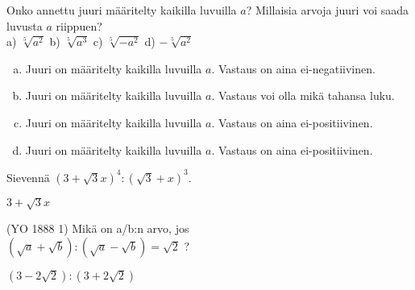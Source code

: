 \begin{tehtava}
Onko annettu juuri määritelty kaikilla luvuilla $a$? Millaisia arvoja juuri voi saada luvusta $a$ riippuen?\\
a) $\sqrt[5]{a^2}$ \quad b) $\sqrt[5]{a^3}$ \quad c) $\sqrt[5]{-a^2}$ \quad d) $- \sqrt[5]{a^2}$

\begin{vastaus}

\begin{enumerate}[a)]
	\item Juuri on määritelty kaikilla luvuilla $a$. Vastaus on aina ei-negatiivinen.
	\item Juuri on määritelty kaikilla luvuilla $a$. Vastaus voi olla mikä tahansa luku.
	\item Juuri on määritelty kaikilla luvuilla $a$. Vastaus on aina ei-positiivinen.
	\item Juuri on määritelty kaikilla luvuilla $a$. Vastaus on aina ei-positiivinen.
\end{enumerate}
\end{vastaus}
\end{tehtava}

\begin{tehtava}
Sievennä $(3+\sqrt{3}x)^4:(\sqrt{3}+x)^3$.
\begin{vastaus}
$3 + \sqrt{3}x$
\end{vastaus}
\end{tehtava}

\begin{tehtava}
(YO 1888 1) Mikä on a/b:n arvo, jos \\
$ (\sqrt{a}+\sqrt{b}):(\sqrt{a}-\sqrt{b})=\sqrt{2}$ ?
\begin{vastaus}
$(3-2\sqrt{2}):(3+2\sqrt{2})$
\end{vastaus}
\end{tehtava}